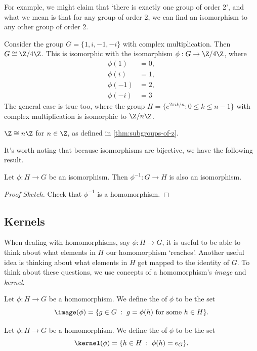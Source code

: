 \documentclass[a4]{scrreprt}
\begin{document}
For example, we might claim that `there is exactly one group of order 2', and what we mean is that for any group of order 2, we can find an isomorphism to any other group of order 2. 

\begin{example}
	Consider the group $G = \{ 1, i, -1, -i \}$ with complex multiplication. Then $G \cong \Z / 4 \Z$. This is isomorphic with the isomorphism $\phi : G \rightarrow \Z / 4 \Z$, where
	\begin{align*}
		\phi(1) &= 0, \\
		\phi(i) &= 1, \\
		\phi(-1) &= 2, \\
		\phi(-i) &= 3
	\end{align*}
	The general case is true too, where the group $H = \{  e^{2 \pi i k/n} : 0 \leq k \leq n - 1 \}$ with complex multiplication is isomorphic to $\Z /n \Z$.
\end{example}

\begin{example}
	$\Z \cong n \Z$ for $n \in \Z$, as defined in \autoref{thm:subgroups-of-z}. 
\end{example}

It's worth noting that because isomorphisms are bijective, we have the following result.

\begin{proposition}
	Let $\phi : H \rightarrow G$ be an isomorphism. Then $\phi^{-1} : G \rightarrow H$ is also an isomorphism.
\end{proposition}
\begin{proof}[Proof Sketch]
	Check that $\phi^{-1}$ is a homomorphism.
\end{proof}

\subsection{Kernels}

When dealing with homomorphisms, say $\phi : H \rightarrow G$, it is useful to be able to think about what elements in $H$ our homomorphism `reaches'.
Another useful idea is thinking about what elements in $H$ get mapped to the identity of $G$. To think about these questions, we use concepts of a homomorphism's \emph{image} and \emph{kernel}. 

\begin{definition}[Image]
	Let $\phi :H \rightarrow G$ be a homomorphism. We define the  of $\phi$ to be the set
	$$
	\image(\phi) = \{ g \in G \; : \; g = \phi(h) \text{ for some } h \in H  \}.
	$$
\end{definition}
\begin{definition}[Kernel]
	Let $\phi : H \rightarrow G$ be a homomorphism. We define the  of $\phi$ to be the set
	$$
	\kernel(\phi) = \{ h \in H \; : \; \phi(h) = e_G \}.
	$$
\end{definition}
\end{document}
